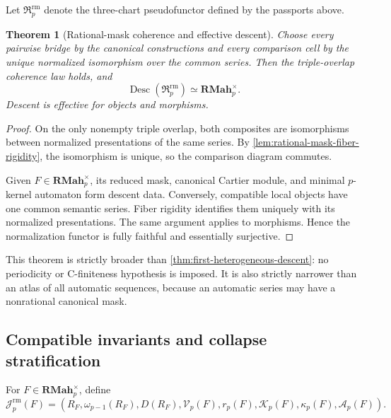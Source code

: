 \documentclass[11pt]{article}
\newtheorem{theorem}{Theorem}[section]
\theoremstyle{definition}
\theoremstyle{remark}
\DeclareMathOperator{\Desc}{Desc}
\newcommand{\RMah}{\mathbf{RMah}}
\begin{document}
Let \(\mathfrak R_p^{\mathrm{rm}}\) denote the three-chart pseudofunctor defined by the passports above.

\begin{theorem}[Rational-mask coherence and effective descent]
\label{thm:rational-mask-effective-descent}
Choose every pairwise bridge by the canonical constructions and every comparison cell by the unique normalized isomorphism over the common series.  Then the triple-overlap coherence law holds, and
\begin{equation}
\label{eq:block04-effective-descent}
\Desc(\mathfrak R_p^{\mathrm{rm}})
\simeq
\RMah_p^{\times}.
\end{equation}
Descent is effective for objects and morphisms.
\end{theorem}

\begin{proof}
On the only nonempty triple overlap, both composites are isomorphisms between normalized presentations of the same series.  By \cref{lem:rational-mask-fiber-rigidity}, the isomorphism is unique, so the comparison diagram commutes.

Given \(F\in\RMah_p^{\times}\), its reduced mask, canonical Cartier module, and minimal \(p\)-kernel automaton form descent data.  Conversely, compatible local objects have one common semantic series.  Fiber rigidity identifies them uniquely with its normalized presentations.  The same argument applies to morphisms.  Hence the normalization functor is fully faithful and essentially surjective.
\end{proof}

This theorem is strictly broader than \cref{thm:first-heterogeneous-descent}: no periodicity or C-finiteness hypothesis is imposed.  It is also strictly narrower than an atlas of all automatic sequences, because an automatic series may have a nonrational canonical mask.

\subsection{Compatible invariants and collapse stratification}

For \(F\in\RMah_p^{\times}\), define
\begin{equation}
\label{eq:block04-invariant-package}
\mathcal J_p^{\mathrm{rm}}(F)
=
\left(
R_F,
\omega_{p-1}(R_F),
D(R_F),
\mathcal V_p(F),
r_p(F),
\mathcal K_p(F),
\kappa_p(F),
\mathcal A_p(F)
\right).
\end{equation}
\end{document}

